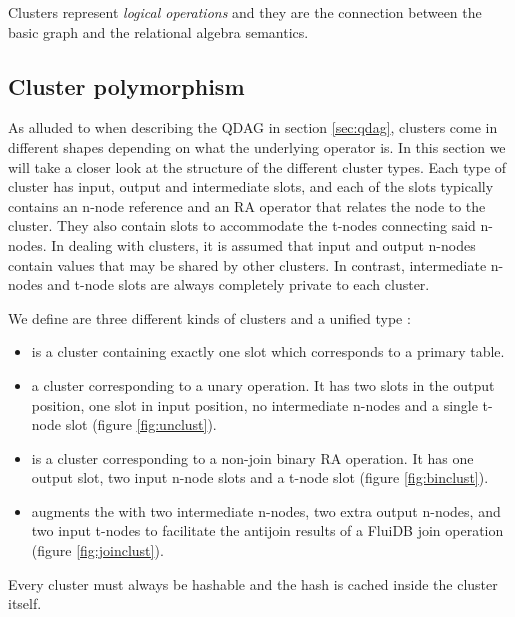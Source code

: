 Clusters represent \emph{logical operations} and they are the connection
between the basic graph and the relational algebra semantics.

\subsection{Cluster polymorphism}
\label{sec:cluster_polymorphism}

As alluded to when describing the QDAG in section \ref{sec:qdag},
clusters come in different shapes depending on what the underlying
operator is. In this section we will take a closer look at the
structure of the different cluster types. Each type of cluster has
input, output and intermediate slots, and each of the slots typically
contains an n-node reference and an RA operator that relates the node
to the cluster. They also contain slots to accommodate the t-nodes
connecting said n-nodes. In dealing with clusters, it is assumed that
input and output n-nodes contain values that may be shared by other
clusters. In contrast, intermediate n-nodes and t-node slots are
always completely private to each cluster.

We define are three different kinds of clusters and a unified type
:

\begin{itemize}
\item {} is a cluster containing exactly one slot which
  corresponds to a primary table.
\item {} a cluster corresponding to a unary operation. It
  has two slots in the output position, one slot in input position, no
  intermediate n-nodes and a single t-node slot (figure
  \ref{fig:unclust}).
\item {} is a cluster corresponding to a non-join binary
  RA operation. It has one output slot, two input n-node slots and a
  t-node slot (figure \ref{fig:binclust}).
\item {} augments the  with two
  intermediate n-nodes, two extra output n-nodes, and two input
  t-nodes to facilitate the antijoin results of a FluiDB join
  operation (figure \ref{fig:joinclust}).
\end{itemize}

Every cluster must always be hashable and the hash is cached inside
the cluster itself.

